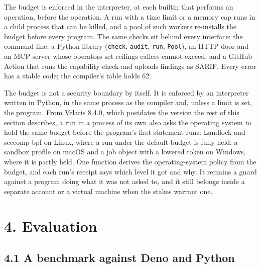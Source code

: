 \documentclass[
]{article}
\begin{document}
The budget is enforced in the interpreter, at each builtin that performs
an operation, before the operation. A run with a time limit or a memory
cap runs in a child process that can be killed, and a pool of such
workers re-installs the budget before every program. The same checks sit
behind every interface: the command line, a Python library
(\texttt{check}, \texttt{audit}, \texttt{run}, \texttt{Pool}), an HTTP
door and an MCP server whose operators set ceilings callers cannot
exceed, and a GitHub Action that runs the capability check and uploads
findings as SARIF. Every error has a stable code; the compiler's table
holds 62.

The budget is not a security boundary by itself. It is enforced by an
interpreter written in Python, in the same process as the compiler and,
unless a limit is set, the program. From Velaris 8.4.0, which postdates
the version the rest of this section describes, a run in a process of
its own also asks the operating system to hold the same budget before
the program's first statement runs: Landlock and seccomp-bpf on Linux,
where a run under the default budget is fully held; a sandbox profile on
macOS and a job object with a lowered token on Windows, where it is
partly held. One function derives the operating-system policy from the
budget, and each run's receipt says which level it got and why. It
remains a guard against a program doing what it was not asked to, and it
still belongs inside a separate account or a virtual machine when the
stakes warrant one.

\section{4. Evaluation}\label{evaluation}

\subsection{4.1 A benchmark against Deno and
Python}\label{a-benchmark-against-deno-and-python}
\end{document}
